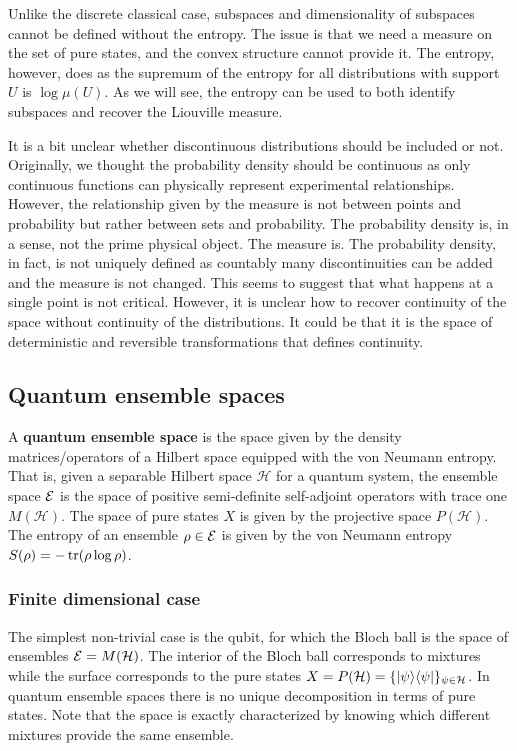 Unlike the discrete classical case, subspaces and dimensionality of subspaces cannot be defined without the entropy. The issue is that we need a measure on the set of pure states, and the convex structure cannot provide it. The entropy, however, does as the supremum of the entropy for all distributions with support $U$ is $\log \mu(U)$. As we will see, the entropy can be used to both identify subspaces and recover the Liouville measure.

It is a bit unclear whether discontinuous distributions should be included or not. Originally, we thought the probability density should be continuous as only continuous functions can physically represent experimental relationships. However, the relationship given by the measure is not between points and probability but rather between sets and probability. The probability density is, in a sense, not the prime physical object. The measure is. The probability density, in fact, is not uniquely defined as countably many discontinuities can be added and the measure is not changed. This seems to suggest that what happens at a single point is not critical. However, it is unclear how to recover continuity of the space without continuity of the distributions. It could be that it is the space of deterministic and reversible transformations that defines continuity.

\subsection{Quantum ensemble spaces}

\begin{defn}
	A \textbf{quantum ensemble space} is the space given by the density matrices/operators of a Hilbert space equipped with the von Neumann entropy. That is, given a separable Hilbert space $\mathcal{H}$ for a quantum system, the ensemble space $\mathcal{E}$ is the space of positive semi-definite self-adjoint operators with trace one $M(\mathcal{H})$. The space of pure states $X$ is given by the projective space $P(\mathcal{H})$. The entropy of an ensemble $\rho \in \mathcal{E}$ is given by the von Neumann entropy $S(\rho) = -\operatorname{tr}(\rho \log \rho)$.
\end{defn}

\subsubsection{Finite dimensional case}

The simplest non-trivial case is the qubit, for which the Bloch ball is the space of ensembles $\mathcal{E} = M(\mathcal{H})$. The interior of the Bloch ball corresponds to mixtures  while the surface corresponds to the pure states $X = P(\mathcal{H}) = \{ |\psi\rangle \langle\psi| \}_{\psi \in \mathcal{H}}$. In quantum ensemble spaces there is no unique decomposition in terms of pure states. Note that the space is exactly characterized by knowing which different mixtures provide the same ensemble.

